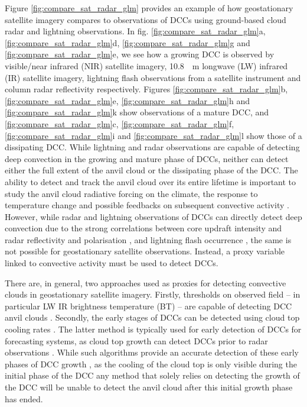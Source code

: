Figure \ref{fig:compare_sat_radar_glm} provides an example of how geostationary satellite imagery compares to observations of DCCs using ground-based cloud radar and lightning observations.
In fig. \ref{fig:compare_sat_radar_glm}a, \ref{fig:compare_sat_radar_glm}d, \ref{fig:compare_sat_radar_glm}g and \ref{fig:compare_sat_radar_glm}e, we see how a growing DCC is observed by visible/near infrared (NIR) satellite imagery, 10.8~\unit{\mu m} longwave (LW) infrared (IR) satellite imagery, lightning flash observations from a satellite instrument and column radar reflectivity respectively.
Figures \ref{fig:compare_sat_radar_glm}b, \ref{fig:compare_sat_radar_glm}e, \ref{fig:compare_sat_radar_glm}h and \ref{fig:compare_sat_radar_glm}k show observations of a mature DCC, and \ref{fig:compare_sat_radar_glm}c, \ref{fig:compare_sat_radar_glm}f, \ref{fig:compare_sat_radar_glm}i and \ref{fig:compare_sat_radar_glm}l show those of a dissipating DCC.
While lightning and radar observations are capable of detecting deep convection in the growing and mature phase of DCCs, neither can detect either the full extent of the anvil cloud or the dissipating phase of the DCC.
The ability to detect and track the anvil cloud over its entire lifetime is important to study the anvil cloud radiative forcing on the climate, the response to temperature change \citep{bony_thermodynamic_2016, hartmann_tropical_2016, ceppi_cloud_2017, gasparini_what_2019} and possible feedbacks on subsequent convective activity \citep{varble_erroneous_2018}.
However, while radar and lightning observations of DCCs can directly detect deep convection due to the strong correlations between core updraft intensity and radar reflectivity and polarisation \citep{austin_relation_1987, rosenfeld_general_1993, zipser_vertical_1994},  and lightning flash occurrence \citep{williams_relationship_1989, deierling_total_2008, wang_relationship_2017}, the same is not possible for geostationary satellite observations.
Instead, a proxy variable linked to convective activity must be used to detect DCCs.

There are, in general, two approaches used as proxies for detecting convective clouds in geostationary satellite imagery. 
Firstly, thresholds on observed field -- in particular LW IR brightness temperature (BT) -- are capable of detecting DCC anvil clouds \citep[e.g.][]{schmetz_monitoring_1997, hong_detection_2005, schroder_deep_2009, liang_integrated_2017, senf_size-resolved_2018}.
Secondly, the early stages of DCCs can be detected using cloud top cooling rates \citep{zinner_cb-tram:_2008, bedka_objective_2010, muller_novel_2019}.
The latter method is typically used for early detection of DCCs for forecasting systems, as cloud top growth can detect DCCs prior to radar observations \citep{roberts_nowcasting_2003}.
While such algorithms provide an accurate detection of these early phases of DCC growth \citep{zinner_validation_2013}, as the cooling of the cloud top is only visible during the initial phase of the DCC any method that solely relies on detecting the growth of the DCC will be unable to detect the anvil cloud after this initial growth phase has ended.

